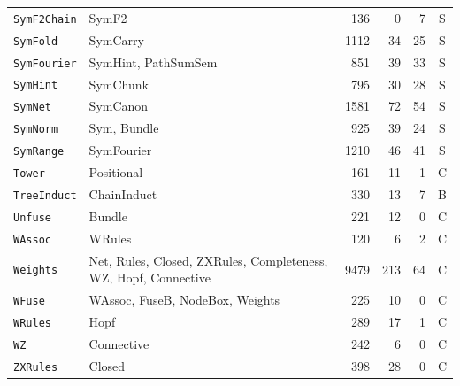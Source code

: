 {\begin{xltabular}{\textwidth}{@{}l>{\raggedright\arraybackslash}Xrrrc@{}}
\texttt{SymF2Chain} & SymF2 & 136 & 0 & 7 & S \\
\texttt{SymFold} & SymCarry & 1112 & 34 & 25 & S \\
\texttt{SymFourier} & SymHint, PathSumSem & 851 & 39 & 33 & S \\
\texttt{SymHint} & SymChunk & 795 & 30 & 28 & S \\
\texttt{SymNet} & SymCanon & 1581 & 72 & 54 & S \\
\texttt{SymNorm} & Sym, Bundle & 925 & 39 & 24 & S \\
\texttt{SymRange} & SymFourier & 1210 & 46 & 41 & S \\
\texttt{Tower} & Positional & 161 & 11 & 1 & C \\
\texttt{TreeInduct} & ChainInduct & 330 & 13 & 7 & B \\
\texttt{Unfuse} & Bundle & 221 & 12 & 0 & C \\
\texttt{WAssoc} & WRules & 120 & 6 & 2 & C \\
\texttt{Weights} & Net, Rules, Closed, ZXRules, Completeness, WZ, Hopf, Connective & 9479 & 213 & 64 & C \\
\texttt{WFuse} & WAssoc, FuseB, NodeBox, Weights & 225 & 10 & 0 & C \\
\texttt{WRules} & Hopf & 289 & 17 & 1 & C \\
\texttt{WZ} & Connective & 242 & 6 & 0 & C \\
\texttt{ZXRules} & Closed & 398 & 28 & 0 & C \\
\end{xltabular}
}

